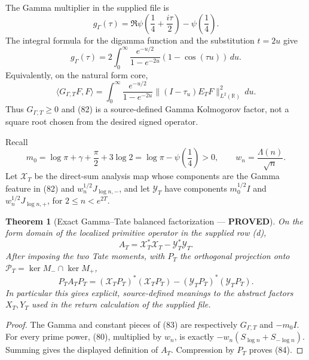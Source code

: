 \documentclass[11pt]{article}
\newtheorem{theorem}{Theorem}
\newcommand{\PROVED}{\textcolor{green!45!black}{\textbf{PROVED}}}
\begin{document}
The Gamma multiplier in the supplied file is
\[
 g_\Gamma(\tau)=\Re\psi\left(\frac14+\frac{i\tau}{2}\right)
                  -\psi\left(\frac14\right).
\]
The integral formula for the digamma function and the substitution $t=2u$
give
\begin{equation}
 g_\Gamma(\tau)
 =2\int_0^\infty
 \frac{e^{-u/2}}{1-e^{-2u}}(1-\cos(\tau u))\,du.       \tag{81}
\end{equation}
Equivalently, on the natural form core,
\begin{equation}
 \langle G_{\Gamma,T}F,F\rangle
 =\int_0^\infty\frac{e^{-u/2}}{1-e^{-2u}}
       \|(I-\tau_u)E_TF\|_{L^2(\mathbb R)}^2\,du.     \tag{82}
\end{equation}
Thus $G_{\Gamma,T}\ge0$ and (82) is a source-defined Gamma Kolmogorov
factor, not a square root chosen from the desired signed operator.

Recall
\[
 m_0=\log\pi+\gamma+\frac\pi2+3\log2
     =\log\pi-\psi\left(\frac14\right)>0,
 \qquad w_n=\frac{\Lambda(n)}{\sqrt n}.
\]
Let $\mathcal X_T$ be the direct-sum analysis map whose components are the
Gamma feature in (82) and $w_n^{1/2}J_{\log n,-}$, and let
$\mathcal Y_T$ have components $m_0^{1/2}I$ and
$w_n^{1/2}J_{\log n,+}$, for $2\le n<e^{2T}$.

\begin{theorem}[Exact Gamma--Tate balanced factorization --- \PROVED]
On the form domain of the localized primitive operator in the supplied row
(d),
\begin{equation}
 A_T=\mathcal X_T^*\mathcal X_T-
     \mathcal Y_T^*\mathcal Y_T.                       \tag{83}
\end{equation}
After imposing the two Tate moments, with $P_T$ the orthogonal projection
onto $\mathcal P_T=\ker M_-\cap\ker M_+$,
\begin{equation}
 P_TA_TP_T=(\mathcal X_TP_T)^*(\mathcal X_TP_T)
           -(\mathcal Y_TP_T)^*(\mathcal Y_TP_T).      \tag{84}
\end{equation}
In particular this gives explicit, source-defined meanings to the abstract
factors $X_T,Y_T$ used in the return calculation of the supplied file.
\end{theorem}

\begin{proof}
The Gamma and constant pieces of (83) are respectively
$G_{\Gamma,T}$ and $-m_0I$.  For every prime power, (80), multiplied by
$w_n$, is exactly
$-w_n(S_{\log n}+S_{-\log n})$.  Summing gives the displayed definition of
$A_T$.  Compression by $P_T$ proves (84).
\end{proof}
\end{document}
